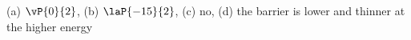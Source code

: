 (a) $\vP{0}{2}$, (b) $\laP{-15}{2}$, (c) no, (d) the barrier is lower and thinner at the higher energy
